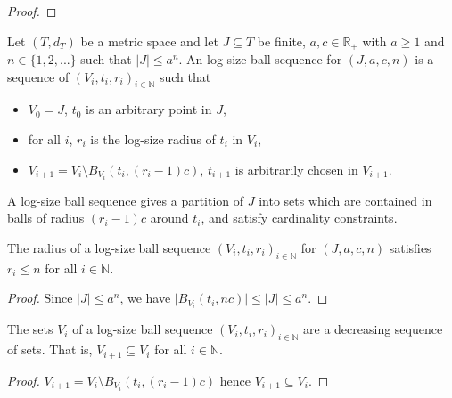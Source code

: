 \begin{proof}
\end{proof}


\begin{definition}\label{def:logSizeBallSequence}
  \mathlibok
Let $(T,d_T)$ be a metric space and let $J \subseteq T$ be finite, $a,c \in \mathbb R_+$ with $a \ge 1$ and $n \in \{1, 2, ...\}$ such that $|J| \le a^n$.
An log-size ball sequence for $(J, a, c, n)$ is a sequence of $(V_i, t_i, r_i)_{i \in \mathbb{N}}$ such that
\begin{itemize}
  \item $V_0 = J$, $t_0$ is an arbitrary point in $J$,
  \item for all $i$, $r_i$ is the log-size radius of $t_i$ in $V_i$,
  \item $V_{i+1} = V_i \setminus B_{V_i}(t_i, (r_i - 1)c)$, $t_{i+1}$ is arbitrarily chosen in $V_{i+1}$.
\end{itemize}
\end{definition}

A log-size ball sequence gives a partition of $J$ into sets which are contained in balls of radius $(r_i - 1)c$ around $t_i$, and satisfy cardinality constraints.


\begin{lemma}\label{lem:logSizeRadius_logSizeBallSequence_le}
  \mathlibok
The radius of a log-size ball sequence $(V_i, t_i, r_i)_{i \in \mathbb{N}}$ for $(J, a, c, n)$ satisfies $r_i \le n$ for all $i \in \mathbb{N}$.
\end{lemma}

\begin{proof}
Since $|J| \le a^n$, we have $\vert B_{V_i}(t_i, n c) \vert \le \vert J \vert \le a^{n}$.
\end{proof}


\begin{lemma}\label{lem:logSizeBallSequence_V_anti}
  \mathlibok
The sets $V_i$ of a log-size ball sequence $(V_i, t_i, r_i)_{i \in \mathbb{N}}$ are a decreasing sequence of sets. That is, $V_{i+1} \subseteq V_i$ for all $i \in \mathbb{N}$.
\end{lemma}

\begin{proof}
$V_{i+1} = V_i \setminus B_{V_i}(t_i, (r_i - 1)c)$ hence $V_{i+1} \subseteq V_i$.
\end{proof}


